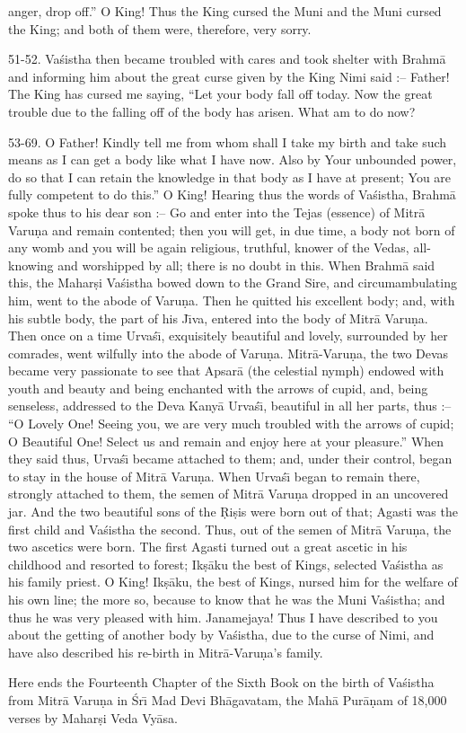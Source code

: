 anger, drop off.'' O King! Thus the King cursed the Muni and the Muni cursed the King; and both of them were, therefore, very sorry.

51-52. Va\'sistha then became troubled with cares and took shelter with Brahm\=a and informing him about the great curse given by the King Nimi said :-- Father! The King has cursed me saying, ``Let your body fall off today. Now the great trouble due to the falling off of the body has arisen. What am to do now?

53-69. O Father! Kindly tell me from whom shall I take my birth and take such means as I can get a body like what I have now. Also by Your unbounded power, do so that I can retain the knowledge in that body as I have at present; You are fully competent to do this.'' O King! Hearing thus the words of Va\'sistha, Brahm\=a spoke thus to his dear son :-- Go and enter into the Tejas (essence) of Mitr\=a Varu\d{n}a and remain contented; then you will get, in due time, a body not born of any womb and you will be again religious, truthful, knower of the Vedas, all-knowing and worshipped by all; there is no doubt in this. When Brahm\=a said this, the Mahar\d{s}i Va\'sistha bowed down to the Grand Sire, and circumambulating him, went to the abode of Varu\d{n}a. Then he quitted his excellent body; and, with his subtle body, the part of his J\={\i}va, entered into the body of Mitr\=a Varu\d{n}a. Then once on a time Urva\'s\={\i}, exquisitely beautiful and lovely, surrounded by her comrades, went wilfully into the abode of Varu\d{n}a. Mitr\=a-Varu\d{n}a, the two Devas became very passionate to see that Apsar\=a (the celestial nymph) endowed with youth and beauty and being enchanted with the arrows of cupid, and, being senseless, addressed to the Deva Kany\=a Urva\'s\={\i}, beautiful in all her parts, thus :-- ``O Lovely One! Seeing you, we are very much troubled with the arrows of cupid; O Beautiful One! Select us and remain and enjoy here at your pleasure.'' When they said thus, Urva\'s\={\i} became attached to them; and, under their control, began to stay in the house of Mitr\=a Varu\d{n}a. When Urva\'s\={\i} began to remain there, strongly attached to them, the semen of Mitr\=a Varu\d{n}a dropped in an uncovered jar. And the two beautiful sons of the \d{R}i\d{s}is were born out of that; Agasti was the first child and Va\'sistha the second. Thus, out of the semen of Mitr\=a Varu\d{n}a, the two ascetics were born. The first Agasti turned out a great ascetic in his childhood and resorted to forest; Ik\d{s}\=aku the best of Kings, selected Va\'sistha as his family priest. O King! Ik\d{s}\=aku, the best of Kings, nursed him for the welfare of his own line; the more so, because to know that he was the Muni Va\'sistha; and thus he was very pleased with him. Janamejaya! Thus I have described to you about the getting of another body by Va\'sistha, due to the curse of Nimi, and have also described his re-birth in Mitr\=a-Varu\d{n}a's family.

Here ends the Fourteenth Chapter of the Sixth Book on the birth of Va\'sistha from Mitr\=a Varu\d{n}a in \'Sr\={\i} Mad Devi Bh\=agavatam, the Mah\=a Pur\=a\d{n}am of 18,000 verses by Mahar\d{s}i Veda Vy\=asa.



